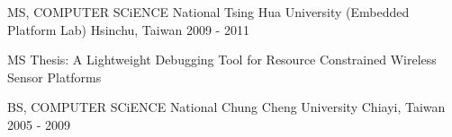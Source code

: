 

\begin{cventries}

  \cventry
    {MS, COMPUTER SCiENCE} %
    {National Tsing Hua University (Embedded Platform Lab)} %
    {Hsinchu, Taiwan} %
    {2009 - 2011} %
    {
      \begin{cvitems} %
        \item {MS Thesis: A Lightweight Debugging Tool for Resource Constrained Wireless Sensor Platforms}
      \end{cvitems}
    }


  \cventry
    {BS, COMPUTER SCiENCE} %
    {National Chung Cheng University} %
    {Chiayi, Taiwan} %
    {2005 - 2009} %
    {
      \begin{cvitems} %
      \end{cvitems}
    }

\end{cventries}
